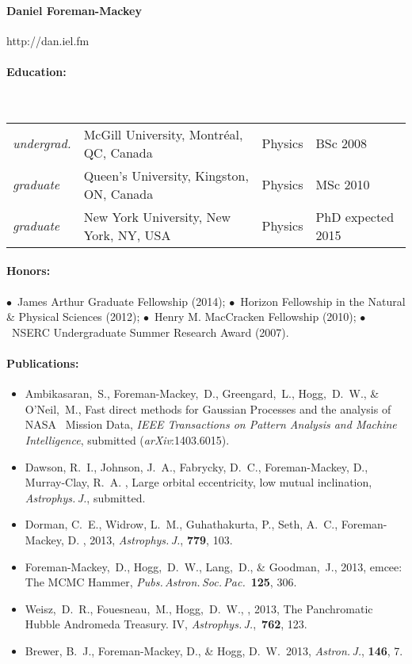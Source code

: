 \documentclass[letterpaper,12pt]{article}
\begin{document}
\paragraph{Daniel Foreman-Mackey} http://dan.iel.fm

\paragraph{Education:}~\\[3pt]
\begin{tabular}{llll}
\textsl{undergrad.}
  & McGill University, Montr\'eal, QC, Canada & Physics & BSc 2008\\
\textsl{graduate}
  & Queen's University, Kingston, ON, Canada & Physics & MSc 2010\\
\textsl{graduate}
  & New York University, New York, NY, USA & Physics & PhD expected 2015
\end{tabular}

\paragraph{Honors:}
$\bullet$~James Arthur Graduate Fellowship (2014);
$\bullet$~Horizon Fellowship in the Natural \& Physical Sciences (2012);
$\bullet$~Henry M. MacCracken Fellowship (2010);
$\bullet$~NSERC Undergraduate Summer Research Award (2007).

\paragraph{Publications:}
\begin{itemize}\setlength{\itemsep}{0pt}
\item
Ambikasaran,~S., Foreman-Mackey,~D., Greengard,~L., Hogg,~D.~W., \& O'Neil,~M.,
{Fast direct methods for Gaussian Processes and the analysis of NASA \Kepler\
Mission Data},
\textit{IEEE Transactions on Pattern Analysis and Machine Intelligence},
submitted (\textit{arXiv}:{1403.6015}).
\item
Dawson, R.~I., Johnson, J.~A., Fabrycky, D.~C., Foreman-Mackey, D.,
Murray-Clay, R.~A. \etal,
{Large orbital eccentricity, low mutual inclination},
\textit{Astrophys.\,J.}, submitted.
\item
Dorman, C.~E., Widrow, L.~M., Guhathakurta, P., Seth, A.~C., Foreman-Mackey,
D. \etal, 2013, \textit{Astrophys.\,J.}, \textbf{779}, 103.
\item
Foreman-Mackey,~D., Hogg,~D.~W., Lang,~D., \& Goodman,~J., 2013,
emcee: The MCMC Hammer, \textit{Pubs.\,Astron.\,Soc.\,Pac.}\ \textbf{125}, 306.
\item
Weisz,~D.~R., Fouesneau,~M., Hogg,~D.~W., \etal, 2013,
The Panchromatic Hubble Andromeda Treasury. IV,
\textit{Astrophys.\,J.},\ \textbf{762}, 123.
\item
Brewer, B.~J., Foreman-Mackey, D., \& Hogg, D.~W.\ 2013,
\textit{Astron.\,J.}, \textbf{146}, 7.
\end{itemize}
\end{document}
